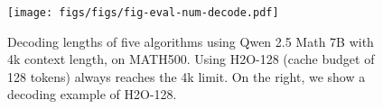 \begin{figure}[ht]
\vskip -0.1in
\begin{center}
\centerline{\texttt{[image: figs/figs/fig-eval-num-decode.pdf]}}
\caption{Decoding lengths of five algorithms using Qwen 2.5 Math 7B with 4k context length, on MATH500. Using H2O-128 (cache budget of 128 tokens) always reaches the 4k limit. On the right, we show a decoding example of H2O-128.}
\label{fig-eval-num-decode}
\end{center}
\vskip -0.3in
\end{figure}